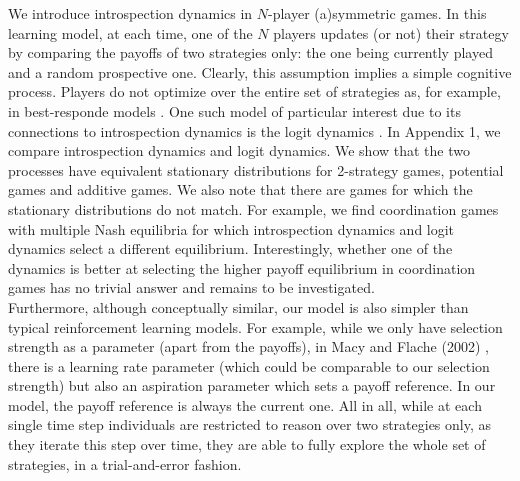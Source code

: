 \documentclass[11pt]{article}
\theoremstyle{plainCl1}
\theoremstyle{plainCl2}
\begin{document}
We introduce introspection dynamics in $N$-player (a)symmetric games. In this learning model, at each time, one of the $N$ players updates (or not) their strategy by comparing the payoffs of two strategies only: the one being currently played and a random prospective one. Clearly, this assumption implies a simple cognitive process. Players do not optimize over the entire set of strategies as, for example, in best-responde models \cite{Blume:GEB:1993, Gaunersdorfer:GEB:1995, Hofbauer:GEB:2005}. One such model of particular interest due to its connections to introspection dynamics is the logit dynamics \cite{Blume:GEB:1993, Alos-Ferrer:GEB:2010,Auletta:Annual:2011}. In Appendix 1, we compare introspection dynamics and logit dynamics. We show that the two processes have equivalent stationary distributions for 2-strategy games, potential games and additive games. We also note that there are games for which the stationary distributions do not match. For example, we find coordination games with multiple Nash equilibria for which introspection dynamics and logit dynamics select a different equilibrium. Interestingly, whether one of the dynamics is better at selecting the higher payoff equilibrium in coordination games has no trivial answer and remains to be investigated. \\ 

\noindent Furthermore, although conceptually similar, our model is also simpler than typical reinforcement learning models. For example, while we only have selection strength as a parameter (apart from the payoffs), in Macy and Flache (2002) \cite{Macy:PNAS:2002}, there is a learning rate parameter (which could be comparable to our selection strength) but also an aspiration parameter which sets a payoff reference. In our model, the payoff reference is always the current one. All in all, while at each single time step individuals are restricted to reason over two strategies only, as they iterate this step over time, they are able to fully explore the whole set of strategies, in a trial-and-error fashion. \\
\end{document}
